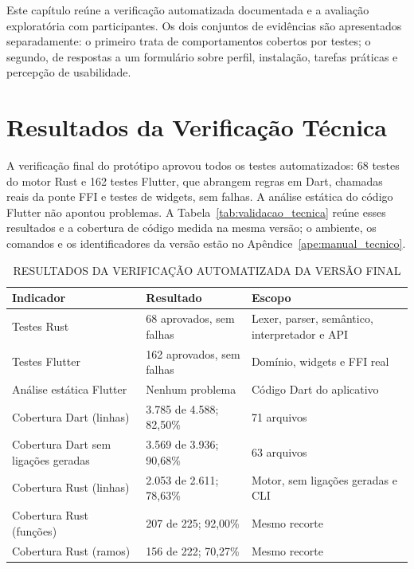 \documentclass[
    12pt
    ,oneside
    ,a4paper
    ,chapter=TITLE
    ,section=TITLE
    ,sumario=abnt-6027-2012]{abntex2}
\renewcommand{\legenda}[2][]{%
    \centering
    \caption[\MakeTextUppercase{#2}]{\maybeLabel{#1}\MakeTextUppercase{#2}}%
}
\begin{document}
Este capítulo reúne a verificação automatizada documentada e a avaliação exploratória
com participantes. Os dois conjuntos de evidências são apresentados separadamente:
o primeiro trata de comportamentos cobertos por testes; o segundo, de respostas a
um formulário sobre perfil, instalação, tarefas práticas e percepção de usabilidade.

\section{Resultados da Verificação Técnica}
\label{sec:validacao_tecnica}

A verificação final do protótipo aprovou todos os testes automatizados: 68 testes
do motor Rust e 162 testes Flutter, que abrangem regras em Dart, chamadas reais da
ponte FFI e testes de widgets, sem falhas. A análise estática do código Flutter não
apontou problemas. A Tabela~\ref{tab:validacao_tecnica} reúne esses resultados e a
cobertura de código medida na mesma versão; o ambiente, os comandos e os
identificadores da versão estão no Apêndice~\ref{ape:manual_tecnico}.

\begin{table}[htb]
\centering
\legenda[tab:validacao_tecnica]{Resultados da verificação automatizada da versão final}
\footnotesize
\begin{tabular}{P{4.3cm}P{4.2cm}P{4.3cm}}
\toprule
Indicador & Resultado & Escopo \\
\midrule
Testes Rust & 68 aprovados, sem falhas & Lexer, parser, semântico, interpretador e API \\
Testes Flutter & 162 aprovados, sem falhas & Domínio, widgets e FFI real \\
Análise estática Flutter & Nenhum problema & Código Dart do aplicativo \\
Cobertura Dart (linhas) & 3.785 de 4.588; 82,50\% & 71 arquivos \\
Cobertura Dart sem ligações geradas & 3.569 de 3.936; 90,68\% & 63 arquivos \\
Cobertura Rust (linhas) & 2.053 de 2.611; 78,63\% & Motor, sem ligações geradas e CLI \\
Cobertura Rust (funções) & 207 de 225; 92,00\% & Mesmo recorte \\
Cobertura Rust (ramos) & 156 de 222; 70,27\% & Mesmo recorte \\
\bottomrule
\end{tabular}
\vspace{0.2cm}
\fonteautor
\end{table}
\FloatBarrier
\end{document}

